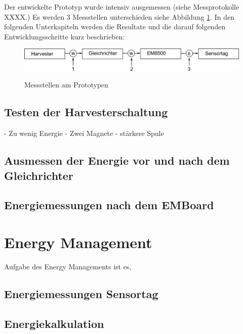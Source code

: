 Der entwickelte Prototyp wurde intensiv ausgemessen (siehe Messprotokolle XXXX.)  Es werden 3 Messstellen unterschieden siehe Abbildung \ref{EnergieMessungStellen}. In den folgenden Unterkapiteln werden die Resultate und die darauf folgenden Entwicklungsschritte kurz beschrieben:

\begin{figure}
  \includegraphics[width=1.0\textwidth]{3Vorgehen/imag/EnergiemessungStellen.png}\label{EnergieMessungStellen} 
  \caption{Messstellen am Prototypen}
\end{figure}

\subsection{Testen der Harvesterschaltung}

- Zu wenig Energie
- Zwei Magnete
- stärkere Spule

\subsection{Ausmessen der Energie vor und nach dem Gleichrichter}


\subsection{Energiemessungen nach dem EMBoard}



\section{Energy Management}

Aufgabe des Energy Managements ist es, 

\subsection{Energiemessungen Sensortag}



\subsection{Energiekalkulation}

